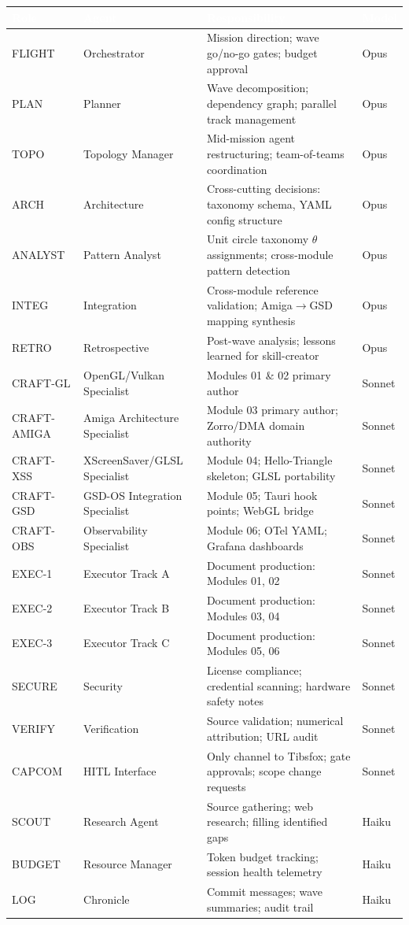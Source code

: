 \documentclass[11pt,letterpaper]{article}
\newcommand{\tableheader}[1]{\textbf{\sffamily\textcolor{white}{#1}}}
\begin{document}
\begin{center}
\begin{tabularx}{\textwidth}{L{2cm}L{3.5cm}XC{2cm}}
\toprule
{}
\tableheader{Role} & \tableheader{Agent} & \tableheader{Responsibility} & \tableheader{Model} \\
\midrule
FLIGHT & Orchestrator & Mission direction; wave go/no-go gates; budget approval & Opus \\
PLAN & Planner & Wave decomposition; dependency graph; parallel track management & Opus \\
TOPO & Topology Manager & Mid-mission agent restructuring; team-of-teams coordination & Opus \\
ARCH & Architecture & Cross-cutting decisions: taxonomy schema, YAML config structure & Opus \\
ANALYST & Pattern Analyst & Unit circle taxonomy $\theta$ assignments; cross-module pattern detection & Opus \\
INTEG & Integration & Cross-module reference validation; Amiga$\to$GSD mapping synthesis & Opus \\
RETRO & Retrospective & Post-wave analysis; lessons learned for skill-creator & Opus \\
CRAFT-GL & OpenGL/Vulkan Specialist & Modules 01 \& 02 primary author & Sonnet \\
CRAFT-AMIGA & Amiga Architecture Specialist & Module 03 primary author; Zorro/DMA domain authority & Sonnet \\
CRAFT-XSS & XScreenSaver/GLSL Specialist & Module 04; Hello-Triangle skeleton; GLSL portability & Sonnet \\
CRAFT-GSD & GSD-OS Integration Specialist & Module 05; Tauri hook points; WebGL bridge & Sonnet \\
CRAFT-OBS & Observability Specialist & Module 06; OTel YAML; Grafana dashboards & Sonnet \\
EXEC-1 & Executor Track A & Document production: Modules 01, 02 & Sonnet \\
EXEC-2 & Executor Track B & Document production: Modules 03, 04 & Sonnet \\
EXEC-3 & Executor Track C & Document production: Modules 05, 06 & Sonnet \\
SECURE & Security & License compliance; credential scanning; hardware safety notes & Sonnet \\
VERIFY & Verification & Source validation; numerical attribution; URL audit & Sonnet \\
CAPCOM & HITL Interface & Only channel to Tibsfox; gate approvals; scope change requests & Sonnet \\
SCOUT & Research Agent & Source gathering; web research; filling identified gaps & Haiku \\
BUDGET & Resource Manager & Token budget tracking; session health telemetry & Haiku \\
LOG & Chronicle & Commit messages; wave summaries; audit trail & Haiku \\
\bottomrule
\end{tabularx}
\end{center}
\end{document}

